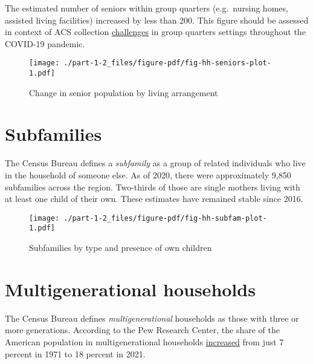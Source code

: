 \documentclass[
  letterpaper,
  DIV=11,
  numbers=noendperiod]{scrreprt}
\begin{document}
The estimated number of seniors within group quarters (e.g.~nursing
homes, assisted living facilities) increased by less than 200. This
figure should be assessed in context of ACS collection
\href{https://www.census.gov/newsroom/blogs/random-samplings/2021/09/collecting-acs-data-from-group-quarters-amid-the-pandemic.html}{challenges}
in group quarters settings throughout the COVID-19 pandemic.

\begin{figure}

{\centering \texttt{[image: ./part-1-2\_files/figure-pdf/fig-hh-seniors-plot-1.pdf]}

}

\caption{\label{fig-hh-seniors-plot}Change in senior population by
living arrangement}

\end{figure}

\hypertarget{subfamilies}{%
\section{Subfamilies}\label{subfamilies}}

The Census Bureau defines a \emph{subfamily} as a group of related
individuals who live in the household of someone else. As of 2020, there
were approximately 9,850 subfamilies across the region. Two-thirds of
those are single mothers living with at least one child of their own.
These estimates have remained stable since 2016.

\begin{figure}

{\centering \texttt{[image: ./part-1-2\_files/figure-pdf/fig-hh-subfam-plot-1.pdf]}

}

\caption{\label{fig-hh-subfam-plot}Subfamilies by type and presence of
own children}

\end{figure}

\hypertarget{multigenerational-households}{%
\section{Multigenerational
households}\label{multigenerational-households}}

The Census Bureau defines \emph{multigenerational} households as those
with three or more generations. According to the Pew Research Center,
the share of the American population in multigenerational households
\href{https://www.pewresearch.org/social-trends/2022/03/24/the-demographics-of-multigenerational-households/}{increased}
from just 7 percent in 1971 to 18 percent in 2021.
\end{document}
